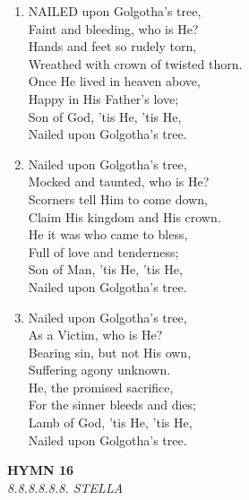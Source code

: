 \documentclass[11pt,a4paper]{article}
\begin{document}
\begin{enumerate}
    \item NAILED upon Golgotha's tree, \\
        Faint and bleeding, who is He? \\
        Hands and feet so rudely torn, \\
        Wreathed with crown of twisted thorn. \\
        Once He lived in heaven above, \\
        Happy in His Father's love; \\
        Son of God, 'tis He, 'tis He, \\
        Nailed upon Golgotha's tree.

    \item Nailed upon Golgotha's tree, \\
        Mocked and taunted, who is He? \\
        Scorners tell Him to come down, \\
        Claim His kingdom and His crown. \\
        He it was who came to bless, \\
        Full of love and tenderness; \\
        Son of Man, 'tis He, 'tis He, \\
        Nailed upon Golgotha's tree.

    \item Nailed upon Golgotha's tree, \\
        As a Victim, who is He? \\
        Bearing sin, but not His own, \\
        Suffering agony unknown. \\
        He, the promised sacrifice, \\
        For the sinner bleeds and dies; \\
        Lamb of God, 'tis He, 'tis He, \\
        Nailed upon Golgotha's tree.

\end{enumerate}

\newpage
\begin{center}
    {\Large \textbf{HYMN 16}}
    \\
    \textit{8.8.8.8.8.8. STELLA}
\end{center}
\vspace{1em}
\end{document}

